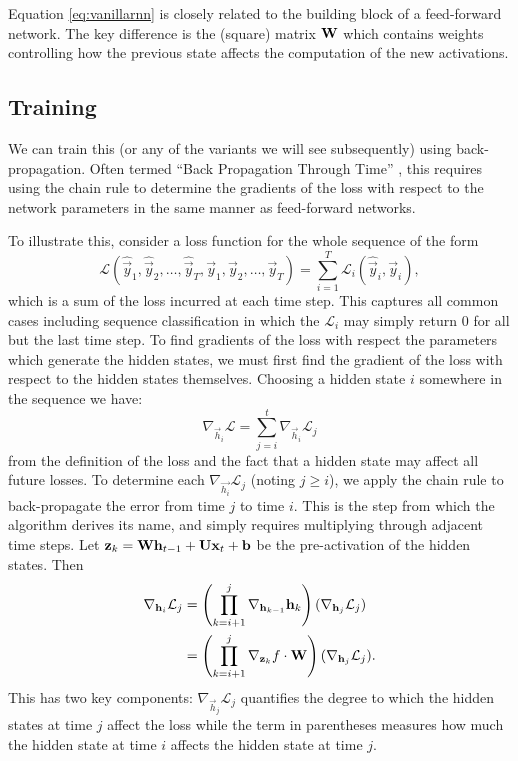 Equation \eqref{eq:vanillarnn} is closely related to the building block of a 
feed-forward network. The key difference is the (square) matrix \(\mathbf{W}\) which contains weights
controlling how the previous state affects the computation of the new activations.

\subsection{Training}
We can train this (or any of the variants we will see subsequently) using back-propagation.
Often termed ``Back Propagation Through Time'' \autocite{Werbos1990}, this requires using the
chain rule to determine the gradients of the loss with respect to the network parameters in
the same manner as feed-forward networks.

To illustrate this, consider a loss function for the whole sequence of
the form
\begin{equation}
	\mathcal{L}(\hat{\vec{y}}_1, \hat{\vec{y}}_2, \dots, \hat{\vec{y}}_T,
				\vec{y}_1, \vec{y}_2, \dots, \vec{y}_T)
	= \sum_{i=1}^T \mathcal{L}_i(\hat{\vec{y}}_i, \vec{y}_i),
	\label{eq:seqloss}
\end{equation} which is a sum of the loss incurred at each time step. This captures all common
cases including sequence classification in which the \(\mathcal{L}_i\) may simply return
\(0\) for all but the last time step. To find gradients of the loss with respect the parameters
which generate the hidden states, we must first find the gradient of the loss with respect to the
hidden states themselves. Choosing a hidden state \(i\) somewhere in the sequence we have:
\begin{equation}
	\nabla_{\vec{h}_i}\mathcal{L} = \sum_{j=i}^t \nabla_{\vec{h}_i}\mathcal{L}_j
	\label{eq:delhL}
\end{equation} from the definition of the loss and the fact that a hidden state may affect all
future losses. To determine each \(\nabla_{\vec{h_i}}\mathcal{L}_j\) (noting \(j \geq i\)), we
apply the chain rule to back-propagate the error from time \(j\) to time \(i\). This is the step
from which the algorithm derives its name, and simply requires multiplying through adjacent
time steps. Let \(\mathbf{z}_k = \mathbf{W}\mathbf{h}_{t-1} + \mathbf{U}\mathbf{x}_t +  \mathbf{b}\) be the
pre-activation of the hidden states. Then
\begin{align}
	\nabla_{\mathbf{h}_i} \mathcal{L}_j &= 
	\left(\prod_{k=i+1}^j \nabla_{\mathbf{h}_{k-1}} \mathbf{h}_k\right)
	(\nabla_{\mathbf{h}_j}\mathcal{L}_j) \\
	&=  \left(\prod_{k=i+1}^j \nabla_{\mathbf{z}_k}f \cdot \mathbf{W}\right)
	(\nabla_{\mathbf{h}_j}\mathcal{L}_j).
	\label{eq:bptt-v}
\end{align} This has two key components: \(\nabla_{\vec{h}_j}\mathcal{L}_j\) quantifies the degree
to which the hidden states at time \(j\) affect the loss while the term in parentheses
measures how much the hidden state at time \(i\) affects the hidden
state at time \(j\).

